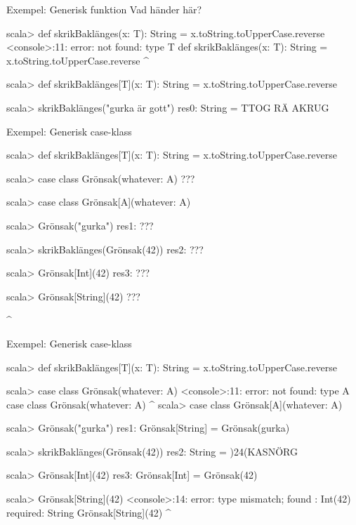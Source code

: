 \begin{Slide}{Exempel: Generisk funktion}
Vad händer här?
\begin{REPL}

scala> def skrikBaklänges(x: T): String = x.toString.toUpperCase.reverse
<console>:11: error: not found: type T
       def skrikBaklänges(x: T): String = x.toString.toUpperCase.reverse
                             ^

scala> def skrikBaklänges[T](x: T): String = x.toString.toUpperCase.reverse

scala> skrikBaklänges("gurka är gott")
res0: String = TTOG RÄ AKRUG
\end{REPL}
\end{Slide}

\ifkompendium\else
\begin{Slide}{Exempel: Generisk case-klass}
\vspace{-0.5em}\begin{REPL}
scala> def skrikBaklänges[T](x: T): String = x.toString.toUpperCase.reverse

scala> case class Grönsak(whatever: A)
???


scala> case class Grönsak[A](whatever: A)

scala> Grönsak("gurka")
res1: ???

scala> skrikBaklänges(Grönsak(42))
res2: ???

scala> Grönsak[Int](42)
res3: ???

scala> Grönsak[String](42)
???



                       ^
\end{REPL}
\end{Slide}
\fi

\begin{Slide}{Exempel: Generisk case-klass}
\vspace{-0.5em}\begin{REPL}
scala> def skrikBaklänges[T](x: T): String = x.toString.toUpperCase.reverse

scala> case class Grönsak(whatever: A)
<console>:11: error: not found: type A
       case class Grönsak(whatever: A)
                                    ^
scala> case class Grönsak[A](whatever: A)

scala> Grönsak("gurka")
res1: Grönsak[String] = Grönsak(gurka)

scala> skrikBaklänges(Grönsak(42))
res2: String = )24(KASNÖRG

scala> Grönsak[Int](42)
res3: Grönsak[Int] = Grönsak(42)

scala> Grönsak[String](42)
<console>:14: error: type mismatch;
 found   : Int(42)
 required: String
       Grönsak[String](42)
                       ^
\end{REPL}
\end{Slide}



